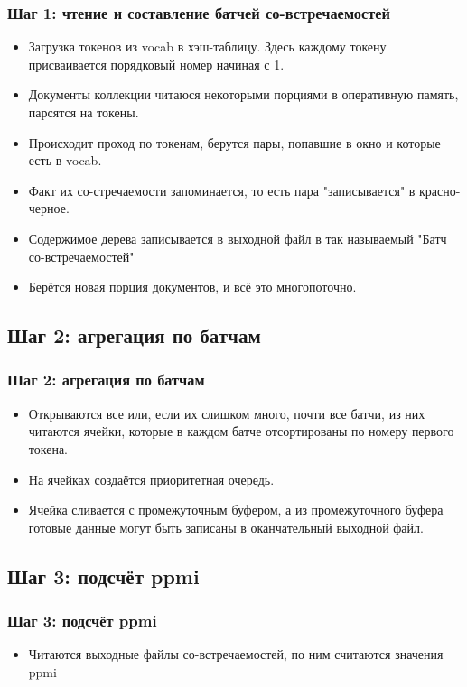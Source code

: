 \documentclass{beamer}
\begin{document}
\begin{frame}
\frametitle{Шаг 1: чтение и составление батчей со-встречаемостей}
\begin{itemize}
\item Загрузка токенов из vocab в хэш-таблицу. Здесь каждому токену присваивается порядковый номер начиная с 1.
\item Документы коллекции читаюся некоторыми порциями в оперативную память, парсятся на токены.
\item Происходит проход по токенам, берутся пары, попавшие в окно и которые есть в vocab.
\item Факт их со-стречаемости запоминается, то есть пара "записывается" в красно-черное.
\item Содержимое дерева записывается в выходной файл в так называемый "Батч со-встречаемостей"
\item Берётся новая порция документов, и всё это многопоточно.
\end{itemize}
\end{frame}


\subsection{Шаг 2: агрегация по батчам}

\begin{frame}
\frametitle{Шаг 2: агрегация по батчам}
\begin{itemize}
\item Открываются все или, если их слишком много, почти все батчи, из них читаются ячейки, которые в каждом батче отсортированы по номеру первого токена.
\item На ячейках создаётся приоритетная очередь.
\item Ячейка сливается с промежуточным буфером, а из промежуточного буфера готовые данные могут быть записаны в оканчательный выходной файл.
\end{itemize}
\end{frame}


\subsection{Шаг 3: подсчёт ppmi}

\begin{frame}
\frametitle{Шаг 3: подсчёт ppmi}
\begin{itemize}
\item Читаются выходные файлы со-встречаемостей, по ним считаются значения ppmi
\end{itemize}
\end{frame}

\end{document}
